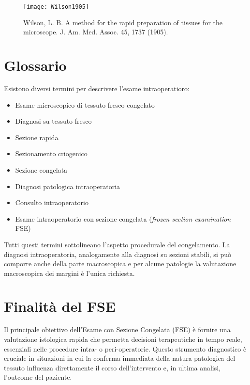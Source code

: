 \begin{figure}[p]
    \centering
    \texttt{[image: Wilson1905]}
    \caption{Wilson, L. B. A method for the rapid preparation of tissues for the microscope. J. Am. Med. Assoc. 45, 1737 (1905).
}
    \label{fig:wilson}
\end{figure}

\section{Glossario}
Esistono diversi termini per descrivere l'esame intraoperatioro:
\begin{itemize}
    \item Esame microscopico di tessuto fresco congelato
    \item Diagnosi su tessuto fresco
    \item Sezione rapida
    \item Sezionamento criogenico
    \item Sezione congelata
    \item Diagnosi patologica intraoperatoria
    \item Consulto intraoperatorio
    \item Esame intraoperatorio con sezione congelata (\emph{frozen section examination }FSE)
\end{itemize}
Tutti questi termini sottolineano l'aspetto procedurale del congelamento. La diagnosi intraoperatoria, analogamente alla diagnosi su sezioni stabili, si può comporre anche della parte macroscopica e per alcune patologie la valutazione macroscopica dei margini è l'unica richiesta.

\section{Finalità del FSE}
Il principale obiettivo dell'Esame con Sezione Congelata (FSE) è fornire una valutazione istologica rapida che permetta decisioni terapeutiche in tempo reale, essenziali nelle procedure intra- o peri-operatorie. Questo strumento diagnostico è cruciale in situazioni in cui la conferma immediata della natura patologica del tessuto influenza direttamente il corso dell’intervento e, in ultima analisi, l'outcome del paziente. 

